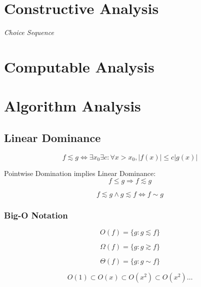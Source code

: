 \section{Constructive Analysis}\label{sec:constructive_analysis}

\emph{Choice Sequence}

\section{Computable Analysis}\label{sec:computable_analysis}

\section{Algorithm Analysis}\label{sec:algorithm_analysis}

\subsection{Linear Dominance}\label{sec:linear_dominance}

\[
    f \lesssim g \Leftrightarrow
    \exists x_0 \exists c : \forall x > x_0, |f(x)| \leq c |g(x)|
\]

Pointwise Domination implies Linear Dominance:
\[
    f \leq g \Rightarrow f \lesssim g
\]

\[
    f \lesssim g \wedge g \lesssim f \Leftrightarrow f \sim g
\]



\subsubsection{Big-O Notation}\label{sec:bigo_notation}

\[
    O(f) = \{ g : g \lesssim f \}
\]

\[
    \Omega(f) = \{ g : g \gtrsim f \}
\]

\[
    \Theta(f) = \{ g : g \sim f \}
\]

\[
    O(1) \subset O(x) \subset O(x^2) \subset O(x^2) \ldots
\]
